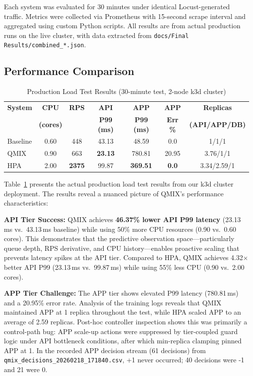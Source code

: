 \documentclass[conference]{IEEEtran}
\begin{document}
Each system was evaluated for 30 minutes under identical
Locust-generated traffic. Metrics were collected via Prometheus with
15-second scrape interval and aggregated using custom Python scripts.
All results are from actual production runs on the live cluster, with
data extracted from \texttt{docs/Final Results/combined\_*.json}.

\subsection{Performance Comparison}

\begin{table}[t]
\centering
\caption{Production Load Test Results (30-minute test, 2-node k3d cluster)}
\label{tab:results}
\setlength{\tabcolsep}{3pt}
\begin{tabular}{lcccccc}
\toprule
\textbf{System} & \textbf{CPU} & \textbf{RPS} & \textbf{API} & \textbf{APP} & \textbf{APP} & \textbf{Replicas} \\
 & \textbf{(cores)} & & \textbf{P99 (ms)} & \textbf{P99 (ms)} & \textbf{Err \%} & \textbf{(API/APP/DB)} \\
\midrule
Baseline & 0.60 & 448 & 43.13 & 48.59 & 0.0 & 1/1/1 \\
QMIX & 0.90 & 663 & \textbf{23.13} & 780.81 & 20.95 & 3.76/1/1 \\
HPA & 2.00 & \textbf{2375} & 99.87 & \textbf{369.51} & \textbf{0.0} & 3.34/2.59/1 \\
\bottomrule
\end{tabular}
\end{table}

Table~\ref{tab:results} presents the actual production load test results
from our k3d cluster deployment. The results reveal a nuanced picture of
QMIX's performance characteristics:

\textbf{API Tier Success:} QMIX achieves \textbf{46.37\% lower API P99 latency}
(23.13\,ms vs.\ 43.13\,ms baseline) while using 50\% more CPU resources
(0.90 vs.\ 0.60 cores). This demonstrates that the predictive observation
space---particularly queue depth, RPS derivative, and CPU history---enables
proactive scaling that prevents latency spikes at the API tier. Compared to
HPA, QMIX achieves 4.32$\times$ better API P99 (23.13\,ms vs.\ 99.87\,ms)
while using 55\% less CPU (0.90 vs.\ 2.00 cores).

\textbf{APP Tier Challenge:} The APP tier shows elevated P99 latency
(780.81\,ms) and a 20.95\% error rate. Analysis of the training logs
reveals that QMIX maintained APP at 1 replica throughout the test, while
HPA scaled APP to an average of 2.59 replicas. Post-hoc controller
inspection shows this was primarily a control-path bug: APP scale-up
actions were suppressed by tier-coupled guard logic under API bottleneck
conditions, after which min-replica clamping pinned APP at 1. In the
recorded APP decision stream (61 decisions) from
\texttt{qmix\_decisions\_20260218\_171840.csv}, +1 never occurred;
40 decisions were -1 and 21 were 0.
\end{document}

